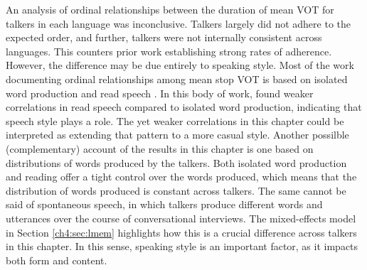 An analysis of ordinal relationships between the duration of mean VOT for talkers in each language was inconclusive. Talkers largely did not adhere to the expected order, and further, talkers were not internally consistent across languages. This counters prior work establishing strong rates of adherence. However, the difference may be due entirely to speaking style. Most of the work documenting ordinal relationships among mean stop VOT is based on isolated word production and read speech \citep[e.g.,][]{chodroff_2017_structure, cho_1999_vot, lisker_1964_vot}. In this body of work, \citet{chodroff_2017_structure} found weaker correlations in read speech compared to isolated word production, indicating that speech style plays a role. The yet weaker correlations in this chapter could be interpreted as extending that pattern to a more casual style. Another possilble (complementary) account of the results in this chapter is one based on distributions of words produced by the talkers. Both isolated word production and reading offer a tight control over the words produced, which means that the distribution of words produced is constant across talkers. The same cannot be said of spontaneous speech, in which talkers produce different words and utterances over the course of conversational interviews. The mixed-effects model in Section \ref{ch4:sec:lmem} highlights how this is a crucial difference across talkers in this chapter. In this sense, speaking style is an important factor, as it impacts both form and content. 


